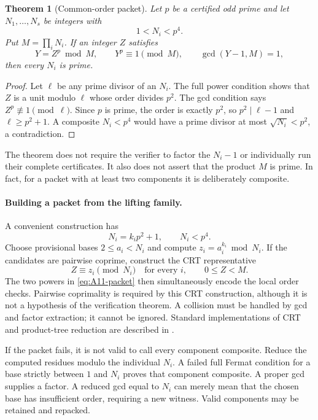 \documentclass[11pt,a4paper]{article}
\newtheorem{theorem}{Theorem}[section]
\theoremstyle{definition}\newtheorem{definition}[theorem]{Definition}
\theoremstyle{remark}\newtheorem{remark}[theorem]{Remark}
\begin{document}
\begin{theorem}[Common-order packet]\label{thm:A11}
Let $p$ be a certified odd prime and let $N_1,\ldots,N_s$ be integers with
\[
 1<N_i<p^4.
\]
Put $M=\prod_iN_i$. If an integer $Z$ satisfies
\begin{equation}\label{eq:A11-packet}
 Y=Z^p\bmod M,\qquad Y^p\equiv1\pmod M,\qquad
 \gcd(Y-1,M)=1,
\end{equation}
then every $N_i$ is prime.
\end{theorem}
\begin{proof}
Let $\ell$ be any prime divisor of an $N_i$. The full power condition
shows that $Z$ is a unit modulo $\ell$ whose order divides $p^2$.
The gcd condition says $Z^p\not\equiv1\pmod\ell$. Since $p$ is prime,
the order is exactly $p^2$, so $p^2\mid\ell-1$ and $\ell\ge p^2+1$.
A composite $N_i<p^4$ would have a prime divisor at most
$\sqrt{N_i}<p^2$, a contradiction.
\end{proof}

The theorem does not require the verifier to factor the $N_i-1$ or
individually run their complete certificates. It also does not assert that
the product $M$ is prime. In fact, for a packet with at least two components
it is deliberately composite.

\paragraph{Building a packet from the lifting family.}
A convenient construction has
\[
 N_i=k_i p^2+1,\qquad N_i<p^4.
\]
Choose provisional bases $2\le a_i<N_i$ and compute
$z_i=a_i^{k_i}\bmod N_i$. If the candidates are pairwise coprime, construct
the CRT representative
\[
 Z\equiv z_i\pmod{N_i}\quad\text{for every }i,\qquad0\le Z<M.
\]
The two powers in \eqref{eq:A11-packet} then simultaneously encode the local
order checks. Pairwise coprimality is required by this CRT construction,
although it is not a hypothesis of the verification theorem. A collision
must be handled by gcd and factor extraction; it cannot be ignored.
Standard implementations of CRT and product-tree reduction are described in
\cite{arith-flint-crt}.

If the packet fails, it is not valid to call every component composite.
Reduce the computed residues modulo the individual $N_i$. A failed full
Fermat condition for a base strictly between $1$ and $N_i$ proves that
component composite. A proper gcd supplies a factor. A reduced gcd equal
to $N_i$ can merely mean that the chosen base has insufficient order,
requiring a new witness. Valid components may be retained and repacked.
\end{document}
